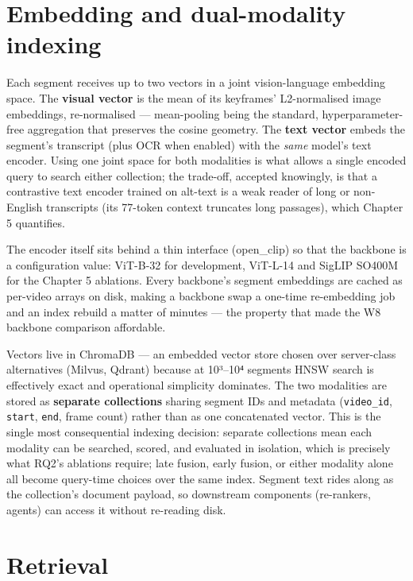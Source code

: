 \section{Embedding and dual-modality
indexing}

Each segment receives up to two vectors in a joint vision-language
embedding space. The \textbf{visual vector} is the mean of its
keyframes' L2-normalised image embeddings, re-normalised ---
mean-pooling being the standard, hyperparameter-free aggregation that
preserves the cosine geometry. The \textbf{text vector} embeds the
segment's transcript (plus OCR when enabled) with the \emph{same}
model's text encoder. Using one joint space for both modalities is what
allows a single encoded query to search either collection; the
trade-off, accepted knowingly, is that a contrastive text encoder
trained on alt-text is a weak reader of long or non-English transcripts
(its 77-token context truncates long passages), which Chapter 5
quantifies.

The encoder itself sits behind a thin interface (open\_clip) so that the
backbone is a configuration value: ViT-B-32 for development, ViT-L-14
and SigLIP SO400M for the Chapter 5 ablations. Every backbone's segment
embeddings are cached as per-video arrays on disk, making a backbone
swap a one-time re-embedding job and an index rebuild a matter of
minutes --- the property that made the W8 backbone comparison
affordable.

Vectors live in ChromaDB --- an embedded vector store chosen over
server-class alternatives (Milvus, Qdrant) because at 10³--10⁴ segments
HNSW \autocite{malkov2020hnsw} search is effectively exact and
operational simplicity dominates. The two modalities are stored as
\textbf{separate collections} sharing segment IDs and metadata
(\texttt{video\_id}, \texttt{start}, \texttt{end}, frame count) rather
than as one concatenated vector. This is the single most consequential
indexing decision: separate collections mean each modality can be
searched, scored, and evaluated in isolation, which is precisely what
RQ2's ablations require; late fusion, early fusion, or either modality
alone all become query-time choices over the same index. Segment text
rides along as the collection's document payload, so downstream
components (re-rankers, agents) can access it without re-reading disk.

\section{Retrieval}


